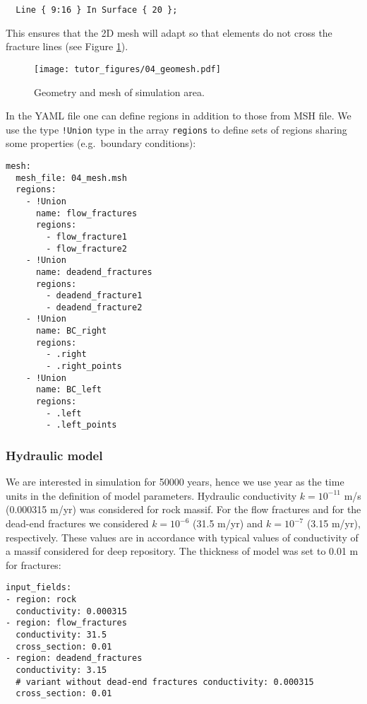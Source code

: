 \begin{verbatim}
  Line { 9:16 } In Surface { 20 };
\end{verbatim}

This ensures that the 2D mesh will adapt so that elements do not cross
the fracture lines (see Figure \ref{fig:mesh}).

\begin{figure}
\hypertarget{fig:mesh}{%
\centering
\texttt{[image: tutor\_figures/04\_geomesh.pdf]}
\caption{Geometry and mesh of simulation area.}\label{fig:mesh}
}
\end{figure}

In the YAML file one can define regions in addition to those from MSH
file. We use the type \texttt{!Union} type in the array \texttt{regions}
to define sets of regions sharing some properties (e.g.~boundary
conditions):

\begin{verbatim}
mesh:
  mesh_file: 04_mesh.msh
  regions:
    - !Union
      name: flow_fractures
      regions:
        - flow_fracture1
        - flow_fracture2
    - !Union
      name: deadend_fractures
      regions:
        - deadend_fracture1
        - deadend_fracture2
    - !Union
      name: BC_right
      regions:
        - .right
        - .right_points
    - !Union
      name: BC_left
      regions:
        - .left
        - .left_points
\end{verbatim}

\subsubsection{Hydraulic model}

We are interested in simulation for 50000 years, hence we use year as
the time units in the definition of model parameters. Hydraulic
conductivity \(k = 10^{-11}\) m/s (0.000315 m/yr) was considered for
rock massif. For the flow fractures and for the dead-end fractures we
considered \(k = 10^{-6}\) (31.5 m/yr) and \(k = 10^{-7}\) (3.15 m/yr),
respectively. These values are in accordance with typical values of
conductivity of a massif considered for deep repository. The thickness
of model was set to 0.01 m for fractures:

\begin{verbatim}
input_fields:
- region: rock
  conductivity: 0.000315
- region: flow_fractures
  conductivity: 31.5
  cross_section: 0.01
- region: deadend_fractures
  conductivity: 3.15
  # variant without dead-end fractures conductivity: 0.000315
  cross_section: 0.01
\end{verbatim}

